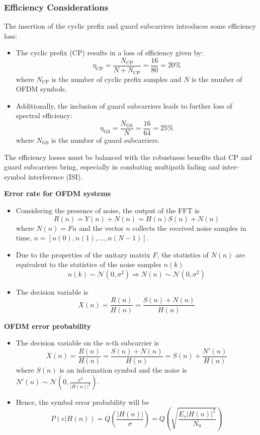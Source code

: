 \subsubsection*{Efficiency Considerations}

The insertion of the cyclic prefix and guard subcarriers introduces some efficiency loss:

\begin{itemize}
    \item The cyclic prefix (CP) results in a loss of efficiency given by:
    \[
    \eta_{\text{CP}} = \frac{N_{\text{CP}}}{N + N_{\text{CP}}} = \frac{16}{80} = 20\%
    \]
    where $N_{\text{CP}}$ is the number of cyclic prefix samples and $N$ is the number of OFDM symbols.

    \item Additionally, the inclusion of guard subcarriers leads to further loss of spectral efficiency:
    \[
    \eta_{\text{GS}} = \frac{N_{\text{GS}}}{N} = \frac{16}{64} = 25\%
    \]
    where $N_{\text{GS}}$ is the number of guard subcarriers.
\end{itemize}

The efficiency losses must be balanced with the robustness benefits that CP and guard subcarriers bring, especially in combating multipath fading and inter-symbol interference (ISI).


\textbf{Error rate for OFDM systems}
\begin{itemize}
    \item Considering the presence of noise, the output of the FFT is
    \[ R(n) = Y(n) + N(n) = H(n)S(n) + N(n) \]
    where \( N(n) = Fn \) and the vector \( n \) collects the received noise samples in time, \( n = [n(0), n(1), \ldots, n(N - 1)] \).
    
    \item Due to the properties of the unitary matrix \( F \), the statistics of \( N(n) \) are equivalent to the statistics of the noise samples \( n(k) \)
    \[ n(k) \sim \mathcal{N}(0, \sigma^2) \Rightarrow N(n) \sim \mathcal{N}(0, \sigma^2) \]
    
    \item The decision variable is 
    \[ X(n) = \frac{R(n)}{H(n)} = \frac{S(n) + N(n)}{H(n)} \]
\end{itemize}


\textbf{OFDM error probability}
\begin{itemize}
    \item The decision variable on the \(n\)-th subcarrier is
    \[ X(n) = \frac{R(n)}{H(n)} = \frac{S(n) + N(n)}{H(n)} = S(n) + \frac{N'(n)}{H(n)} \]
    where \( S(n) \) is an information symbol and the noise is \( N'(n) \sim \mathcal{N}\left(0, \frac{\sigma^2}{|H(n)|^2}\right) \).
    
    \item Hence, the symbol error probability will be
    \[ P(e|H(n)) = Q\left(\frac{|H(n)|}{\sigma}\right) = Q\left(\sqrt{\frac{E_s |H(n)|^2}{N_0}}\right) \]
\end{itemize}

